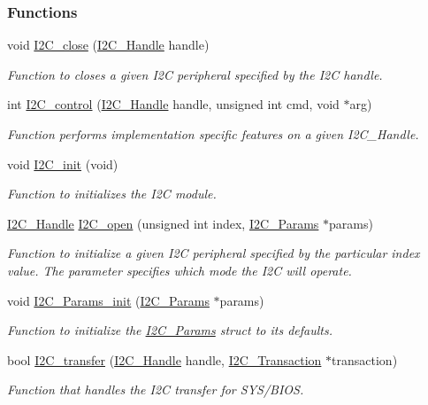 \subsubsection*{Functions}
\begin{DoxyCompactItemize}
\item 
void \hyperlink{_i2_c_8h_a12c86d89a687f2ee1eb980d99c32326d}{I2\-C\-\_\-close} (\hyperlink{_i2_c_8h_a5809a229f8395c87f59e63128195c1bf}{I2\-C\-\_\-\-Handle} handle)
\begin{DoxyCompactList}\small\item\em Function to closes a given I2\-C peripheral specified by the I2\-C handle. \end{DoxyCompactList}\item 
int \hyperlink{_i2_c_8h_a633003582213a5098467a4e647cc52f9}{I2\-C\-\_\-control} (\hyperlink{_i2_c_8h_a5809a229f8395c87f59e63128195c1bf}{I2\-C\-\_\-\-Handle} handle, unsigned int cmd, void $\ast$arg)
\begin{DoxyCompactList}\small\item\em Function performs implementation specific features on a given I2\-C\-\_\-\-Handle. \end{DoxyCompactList}\item 
void \hyperlink{_i2_c_8h_a9ff51ddf1d325776fef90cce0223772b}{I2\-C\-\_\-init} (void)
\begin{DoxyCompactList}\small\item\em Function to initializes the I2\-C module. \end{DoxyCompactList}\item 
\hyperlink{_i2_c_8h_a5809a229f8395c87f59e63128195c1bf}{I2\-C\-\_\-\-Handle} \hyperlink{_i2_c_8h_ae1aa99e1fee4517406018e10025cca0e}{I2\-C\-\_\-open} (unsigned int index, \hyperlink{struct_i2_c___params}{I2\-C\-\_\-\-Params} $\ast$params)
\begin{DoxyCompactList}\small\item\em Function to initialize a given I2\-C peripheral specified by the particular index value. The parameter specifies which mode the I2\-C will operate. \end{DoxyCompactList}\item 
void \hyperlink{_i2_c_8h_ab11636302074d67180207ab81ceb323c}{I2\-C\-\_\-\-Params\-\_\-init} (\hyperlink{struct_i2_c___params}{I2\-C\-\_\-\-Params} $\ast$params)
\begin{DoxyCompactList}\small\item\em Function to initialize the \hyperlink{struct_i2_c___params}{I2\-C\-\_\-\-Params} struct to its defaults. \end{DoxyCompactList}\item 
bool \hyperlink{_i2_c_8h_ac5d827b67fe77d7d179026941cc069d7}{I2\-C\-\_\-transfer} (\hyperlink{_i2_c_8h_a5809a229f8395c87f59e63128195c1bf}{I2\-C\-\_\-\-Handle} handle, \hyperlink{struct_i2_c___transaction}{I2\-C\-\_\-\-Transaction} $\ast$transaction)
\begin{DoxyCompactList}\small\item\em Function that handles the I2\-C transfer for S\-Y\-S/\-B\-I\-O\-S. \end{DoxyCompactList}\end{DoxyCompactItemize}


